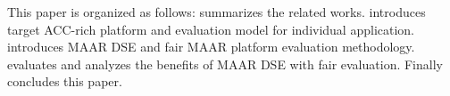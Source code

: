 This paper is organized as follows:  summarizes the related works.  introduces target ACC-rich platform and evaluation model for individual application.  introduces MAAR DSE and fair MAAR platform evaluation methodology.  evaluates and analyzes the benefits of MAAR DSE with fair evaluation. Finally  concludes this paper.


